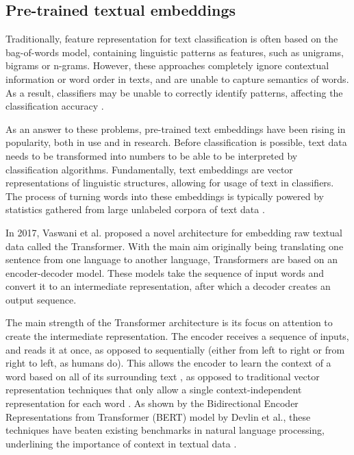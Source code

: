 \subsection{Pre-trained textual embeddings}
Traditionally, feature representation for text classification is often based on the bag-of-words model, containing linguistic patterns as features, such as unigrams, bigrams or n-grams.
However, these approaches completely ignore contextual information or word order in texts, and are unable to capture semantics of words. 
As a result, classifiers may be unable to correctly identify patterns, affecting the classification accuracy \cite{lai2015}.

As an answer to these problems, pre-trained text embeddings have been rising in popularity, both in use and in research.
Before classification is possible, text data needs to be transformed into numbers to be able to be interpreted by classification algorithms.
Fundamentally, text embeddings are vector representations of linguistic structures, allowing for usage of text in classifiers. 
The process of turning words into these embeddings is typically powered by statistics gathered from large unlabeled corpora of text data \cite{mikolov2017}.

In 2017, Vaswani et al. proposed a novel architecture for embedding raw textual data called the Transformer. 
With the main aim originally being translating one sentence from one language to another language, Transformers are based on an encoder-decoder model.
These models take the sequence of input words and convert it to an intermediate representation, after which a decoder creates an output sequence.

The main strength of the Transformer architecture is its focus on attention to create the intermediate representation.
The encoder receives a sequence of inputs, and reads it at once, as opposed to sequentially (either from left to right or from right to left, as humans do). 
This allows the encoder to learn the context of a word based on all of its surrounding text \cite{vaswani2017}, as opposed to traditional vector representation techniques that only allow a single context-independent representation for each word \cite{peters2018}.
As shown by the Bidirectional Encoder Representations from Transformer (BERT) model by Devlin et al., these techniques have beaten existing benchmarks in natural language processing, underlining the importance of context in textual data \cite{devlin2018}.


